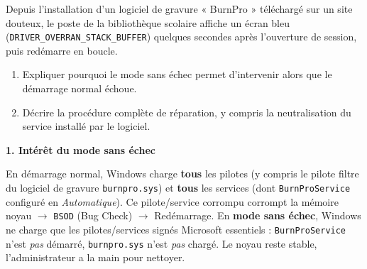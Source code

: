 \documentclass[11pt]{article}
\begin{document}
\begin{exoresolu}
Depuis l'installation d'un logiciel de gravure « BurnPro » téléchargé sur un site douteux, le poste de la bibliothèque scolaire affiche un écran bleu (\texttt{DRIVER\_OVERRAN\_STACK\_BUFFER}) quelques secondes après l'ouverture de session, puis redémarre en boucle.
\begin{enumerate}
\item Expliquer pourquoi le mode sans échec permet d'intervenir alors que le démarrage normal échoue.
\item Décrire la procédure complète de réparation, y compris la neutralisation du service installé par le logiciel.
\end{enumerate}
\tcblower
\textbf{1. Intérêt du mode sans échec}

En démarrage normal, Windows charge \textbf{tous} les pilotes (y compris le pilote filtre du logiciel de gravure \texttt{burnpro.sys}) et \textbf{tous} les services (dont \texttt{BurnProService} configuré en \emph{Automatique}). Ce pilote/service corrompu corrompt la mémoire noyau $\rightarrow$ \texttt{BSOD} (Bug Check) $\rightarrow$ Redémarrage. En \textbf{mode sans échec}, Windows ne charge que les pilotes/services signés Microsoft essentiels : \texttt{BurnProService} n'est \emph{pas} démarré, \texttt{burnpro.sys} n'est \emph{pas} chargé. Le noyau reste stable, l'administrateur a la main pour nettoyer.


\end{exoresolu}
\end{document}
